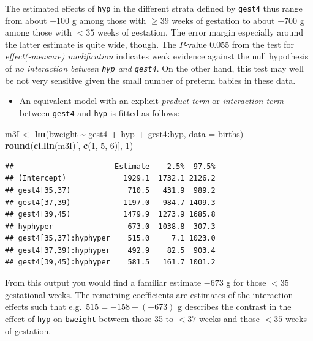 \documentclass[
]{book}
\newenvironment{Shaded}{\begin{snugshade}}{\end{snugshade}}
\newcommand{\AttributeTok}[1]{\textcolor[rgb]{0.13,0.29,0.53}{#1}}
\newcommand{\DecValTok}[1]{\textcolor[rgb]{0.00,0.00,0.81}{#1}}
\newcommand{\FunctionTok}[1]{\textcolor[rgb]{0.13,0.29,0.53}{\textbf{#1}}}
\newcommand{\NormalTok}[1]{#1}
\newcommand{\OtherTok}[1]{\textcolor[rgb]{0.56,0.35,0.01}{#1}}
\newcommand{\SpecialCharTok}[1]{\textcolor[rgb]{0.81,0.36,0.00}{\textbf{#1}}}
\providecommand{\tightlist}{%
  \setlength{\itemsep}{0pt}\setlength{\parskip}{0pt}}
\begin{document}
The estimated effects of \texttt{hyp} in the different strata defined by \texttt{gest4} thus
range from about \(-100\) g among those with \(\geq 39\) weeks of
gestation to about \(-700\) g among those
with \(< 35\) weeks of gestation. The error margin especially
around the latter estimate is quite wide, though.
The \(P\)-value 0.055 from the test for
\emph{effect(-measure) modification} indicates weak evidence
against the null hypothesis of \emph{no interaction between \texttt{hyp} and \texttt{gest4}}.
On the other hand, this test may well be not very sensitive given
the small number of preterm babies in these data.

\begin{itemize}
\tightlist
\item
  An equivalent model with an explicit \emph{product term} or
  \emph{interaction term} between \texttt{gest4} and \texttt{hyp} is
  fitted as follows:
\end{itemize}

\begin{Shaded}
\begin{Highlighting}[]
\NormalTok{m3I }\OtherTok{\textless{}{-}} \FunctionTok{lm}\NormalTok{(bweight }\SpecialCharTok{\textasciitilde{}}\NormalTok{ gest4 }\SpecialCharTok{+}\NormalTok{ hyp }\SpecialCharTok{+}\NormalTok{ gest4}\SpecialCharTok{:}\NormalTok{hyp, }\AttributeTok{data =}\NormalTok{ births)}
\FunctionTok{round}\NormalTok{(}\FunctionTok{ci.lin}\NormalTok{(m3I)[, }\FunctionTok{c}\NormalTok{(}\DecValTok{1}\NormalTok{, }\DecValTok{5}\NormalTok{, }\DecValTok{6}\NormalTok{)], }\DecValTok{1}\NormalTok{)}
\end{Highlighting}
\end{Shaded}

\begin{verbatim}
##                       Estimate    2.5%  97.5%
## (Intercept)             1929.1  1732.1 2126.2
## gest4[35,37)             710.5   431.9  989.2
## gest4[37,39)            1197.0   984.7 1409.3
## gest4[39,45)            1479.9  1273.9 1685.8
## hyphyper                -673.0 -1038.8 -307.3
## gest4[35,37):hyphyper    515.0     7.1 1023.0
## gest4[37,39):hyphyper    492.9    82.5  903.4
## gest4[39,45):hyphyper    581.5   161.7 1001.2
\end{verbatim}

From this output you would find a familiar estimate \(-673\) g for those \(< 35\) gestational weeks.
The remaining coefficients are estimates of the interaction effects such that e.g.~\(515 = -158 - (-673)\) g
describes the contrast in the effect of \texttt{hyp} on \texttt{bweight}
between those 35 to \(< 37\) weeks and those \(< 35\) weeks of gestation.
\end{document}
